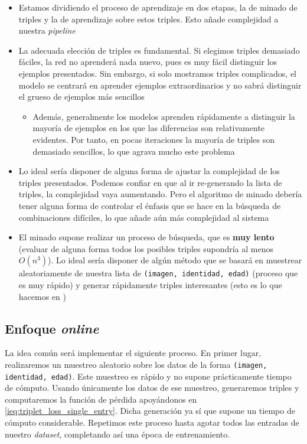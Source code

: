 \begin{itemize}
    \item Estamos dividiendo el proceso de aprendizaje en dos etapas, la de minado de triples y la de aprendizaje sobre estos triples. Esto añade complejidad a nuestra \textit{pipeline}
    \item La adecuada elección de triples es fundamental. Si elegimos triples demasiado fáciles, la red no aprenderá nada nuevo, pues es muy fácil distinguir los ejemplos presentados. Sin embargo, si solo mostramos triples complicados, el modelo se centrará en aprender ejemplos extraordinarios y no sabrá distinguir el grueso de ejemplos más sencillos
        \begin{itemize}
            \item Además, generalmente los modelos aprenden rápidamente a distinguir la mayoría de ejemplos en los que las diferencias son relativamente evidentes. Por tanto, en pocas iteraciones la mayoría de triples son demasiado sencillos, lo que agrava mucho este problema
        \end{itemize}
    \item Lo ideal sería disponer de alguna forma de ajustar la complejidad de los triples presentados. Podemos confiar en que al ir re-generando la lista de triples, la complejidad vaya aumentando. Pero el algoritmo de minado debería tener alguna forma de controlar el énfasis que se hace en la búsqueda de combinaciones difíciles, lo que añade aún más complejidad al sistema
    \item El minado supone realizar un proceso de búsqueda, que es \textbf{muy lento} (evaluar de alguna forma todos los posibles triples supondría al menos $O(n^3)$). Lo ideal sería disponer de algún método que se basará en muestrear aleatoriamente de nuestra lista de \lstinline{(imagen, identidad, edad)} (proceso que es muy rápido) y generar rápidamente triples interesantes (esto es lo que hacemos en )
\end{itemize}

\subsection{Enfoque \textit{online}} \label{isubs:triples_online}

La idea común será implementar el siguiente proceso. En primer lugar, realizaremos un muestreo aleatorio sobre los datos de la forma \lstinline{(imagen, identidad, edad)}. Este muestreo es rápido y no supone prácticamente tiempo de cómputo. Usando únicamente los datos de ese muestreo, generaremos triples y computaremos la función de pérdida apoyándonos en \eqref{ieq:triplet_loss_single_entry}. Dicha generación ya sí que supone un tiempo de cómputo considerable. Repetimos este proceso hasta agotar todos las entradas de nuestro \textit{dataset}, completando así una época de entrenamiento.

